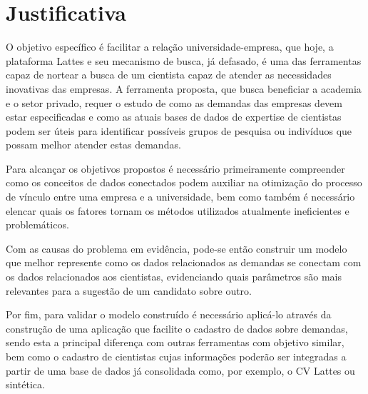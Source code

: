 \section{Justificativa}\label{sec:justificativa}

O objetivo específico é facilitar a relação universidade-empresa, que hoje, a plataforma Lattes e seu mecanismo de busca, já defasado, é uma das ferramentas capaz de nortear a busca de um cientista capaz de atender as necessidades inovativas das empresas. A ferramenta proposta, que busca beneficiar a academia e o setor privado, requer o estudo de como as demandas das empresas devem estar especificadas e como as atuais bases de dados de expertise de cientistas podem ser úteis para identificar possíveis grupos de pesquisa ou indivíduos que possam melhor atender estas demandas.

Para alcançar os objetivos propostos é necessário primeiramente compreender como os conceitos de dados conectados podem auxiliar na otimização do processo de vínculo entre uma empresa e a universidade, bem como também é necessário elencar quais os fatores tornam os métodos utilizados atualmente ineficientes e problemáticos.

Com as causas do problema em evidência, pode-se então construir um modelo que melhor represente como os dados relacionados as demandas se conectam com os dados relacionados aos cientistas, evidenciando quais parâmetros são mais relevantes para a sugestão de um candidato sobre outro. 

Por fim, para validar o modelo construído é necessário aplicá-lo através da construção de uma aplicação que facilite o cadastro de dados sobre demandas, sendo esta a principal diferença com outras ferramentas com objetivo similar, bem como o cadastro de cientistas cujas informações poderão ser integradas a partir de uma base de dados já consolidada como, por exemplo, o CV Lattes ou sintética.



